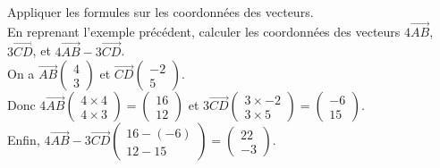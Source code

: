 \begin{Méthode}Appliquer les formules sur les coordonnées des vecteurs. \\
En reprenant l'exemple précédent, calculer les coordonnées des vecteurs $4\overrightarrow{AB}$, $3\overrightarrow{CD}$, et $4\overrightarrow{AB}-3\overrightarrow{CD}$. \\

On a $\overrightarrow{AB}\begin{pmatrix} 
4 \\
3
 \end{pmatrix}$ et 
$\overrightarrow{CD}\begin{pmatrix} 
-2 \\
5
 \end{pmatrix}$.\\ Donc $4\overrightarrow{AB}\begin{pmatrix} 
4\times 4 \\
4\times 3
 \end{pmatrix}=\begin{pmatrix} 
16 \\
12
 \end{pmatrix}$ et $3\overrightarrow{CD}\begin{pmatrix} 
3\times -2 \\
3\times 5
 \end{pmatrix}=\begin{pmatrix} 
-6 \\
15
 \end{pmatrix}$. \\
 Enfin, $4\overrightarrow{AB}-3\overrightarrow{CD}\begin{pmatrix} 
16-(-6) \\
12-15
 \end{pmatrix}=\begin{pmatrix} 
22 \\
-3
 \end{pmatrix}$.

\end{Méthode}
\vspace{0.5cm}
